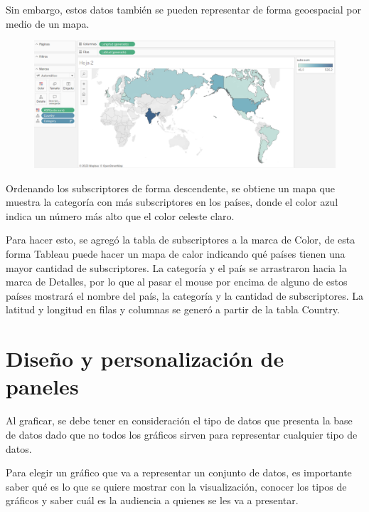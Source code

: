 \documentclass[a4paper, 12pt]{book}
\begin{document}
Sin embargo, estos datos también se pueden representar de forma geoespacial por medio de un mapa.
\begin{figure}[H] 
	\centering 
	\includegraphics[width=0.9\linewidth]{mapa1.png}
	\caption{}
\end{figure}
Ordenando los subscriptores de forma descendente, se obtiene un mapa que muestra la categoría con más subscriptores en los países, donde el color azul indica un número más alto que el color celeste claro.

Para hacer esto, se agregó la tabla de subscriptores a la marca de Color, de esta forma Tableau puede hacer un mapa de calor indicando qué países tienen una mayor cantidad de subscriptores. La categoría y el país se arrastraron hacia la marca de Detalles, por lo que al pasar el mouse por encima de alguno de estos países mostrará el nombre del país, la categoría y la cantidad de subscriptores. La latitud y longitud en filas y columnas se generó a partir de la tabla Country.

\section{Diseño y personalización de paneles}
Al graficar, se debe tener en consideración el tipo de datos que presenta la base de datos dado que no todos los gráficos sirven para representar cualquier tipo de datos.

Para elegir un gráfico que va a representar un conjunto de datos, es importante saber qué es lo que se quiere mostrar con la visualización, conocer los tipos de gráficos y saber cuál es la audiencia a quienes se les va a presentar.
\end{document}
